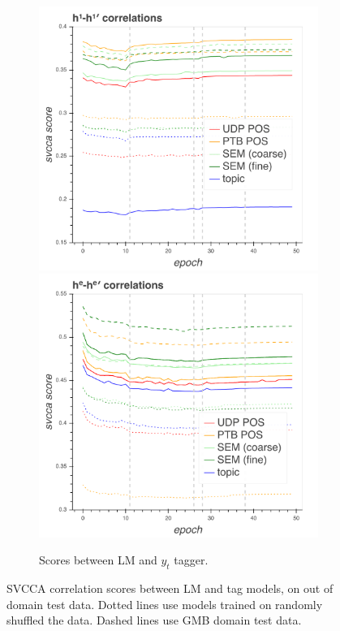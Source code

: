 \begin{figure}
\begin{subfigure}{.48\textwidth}
\includegraphics[width=\textwidth]{svcca/cca_input_domain_1.png}
\includegraphics[width=\textwidth]{svcca/cca_input_domain_encoder.png}
\caption{Scores between LM and $y_{t}$ tagger.}
\label{fig:domain_cca_input}
\end{subfigure}
\caption{SVCCA correlation scores between LM and tag models, on out of domain test data. Dotted lines use models trained on randomly shuffled the data. Dashed lines use GMB domain test data.}
\end{figure}

